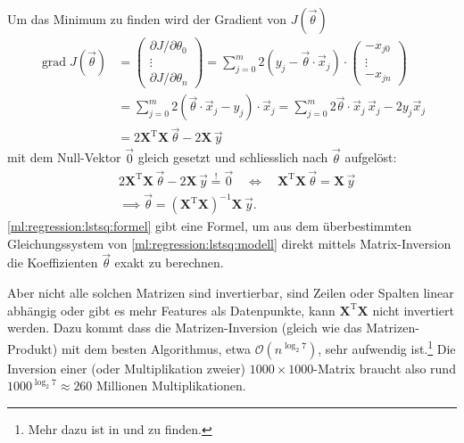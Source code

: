 Um das Minimum zu finden wird der Gradient von $J(\vec \theta)$ 
\begin{align}
    \operatorname{grad} J(\vec \theta) &=
    \begin{pmatrix} \partial J / \partial \theta_0 \\ \vdots \\ \partial J / \partial \theta_n \end{pmatrix}
    = \sum_{j = 0}^{m} 2 (y_j - \vec \theta \cdot \vec x_j) \cdot
    \begin{pmatrix} - x_{j0}\\ \vdots \\ - x_{jn} \end{pmatrix} \nonumber\\
    &= \sum_{j = 0}^{m} 2 \left( \vec \theta \cdot \vec x_j - y_j \right) \cdot \vec x_j
    = \sum_{j = 0}^{m} 2 \vec \theta \cdot \vec x_j\, \vec x_j - 2 y_j \vec x_j \nonumber\\
    &= 2 \mathbf{X}^\mathrm{T} \mathbf{X}\, \vec \theta - 2 \mathbf{X}\, \vec y
    \label{ml:regression:lstsq:grad}
\end{align}
mit dem Null-Vektor $\vec 0$ gleich gesetzt
und schliesslich nach $\vec \theta$ aufgelöst:
\begin{align}
    &2\mathbf{X}^\mathrm{T} \mathbf{X}\, \vec \theta - 2 \mathbf{X}\, \vec y \overset{!}= \vec 0 \quad\Leftrightarrow\quad
    \mathbf{X}^\mathrm{T} \mathbf{X}\, \vec \theta = \mathbf{X}\, \vec y \nonumber\\
    &\implies \vec \theta = \left( \mathbf{X}^\mathrm{T} \mathbf{X} \right)^{-1} \mathbf{X} \, \vec y.
    \label{ml:regression:lstsq:formel}
\end{align}
\eqref{ml:regression:lstsq:formel} gibt eine Formel, um aus dem überbestimmten
Gleichungssystem von \eqref{ml:regression:lstsq:modell} direkt mittels Matrix-Inversion
die Koeffizienten $\vec \theta$ exakt zu berechnen.

\bigskip
Aber nicht alle solchen Matrizen sind invertierbar, sind Zeilen oder Spalten linear
abhängig oder gibt es mehr Features als Datenpunkte, kann $\mathbf{X}^\mathrm{T}\mathbf{X}$
nicht invertiert werden.
Dazu kommt dass die Matrizen-Inversion (gleich wie das Matrizen-Produkt) mit dem besten
Algorithmus, etwa $\mathcal{O}(n^{\log_2 7})$, sehr aufwendig ist.\footnote{Mehr dazu ist
in \cite{ml:computational-complexity-math-op} und
\cite{ml:computational-complexity-matrix-mult} zu finden.} Die Inversion  einer (oder
Multiplikation zweier) $1000 \times 1000$-Matrix braucht also rund $1000^{\log_2 7}
\approx 260$ Millionen Multiplikationen.

